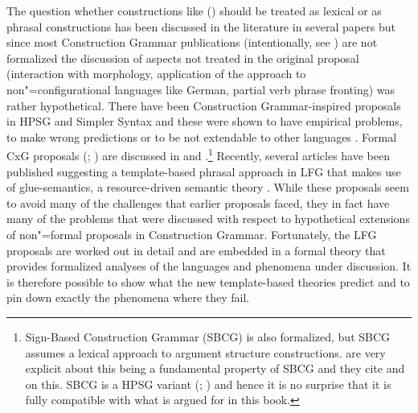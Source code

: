 The question whether constructions like () should be treated as lexical or as
phrasal constructions has been discussed in the literature in several papers
\citep{GJ2004a,Mueller2006d,Goldberg2013b,MWArgSt} but since most Construction Grammar publications
(intentionally, see ) are not formalized the discussion of aspects not treated
in the original proposal (\eg interaction with morphology, application of the approach to
non"=configurational languages like German, partial verb phrase fronting) was rather
hypothetical. There have been Construction Grammar-inspired proposals in HPSG
\citep{Haugereid2007a,Haugereid2009a} and Simpler Syntax \citep{CJ2005a} and these were shown to
have empirical problems, to make wrong predictions or to be not extendable to other languages
\citep{MuellerUnifying,MuellerGT-Eng1}. Formal CxG proposals (\citealp{BC2005a};
\citealp{vanTrijp2011a}) are discussed in  and
.\footnote{%
  Sign-Based Construction Grammar (SBCG) is also formalized, but SBCG assumes a lexical approach to
  argument structure constructions. \citet*{SBK2012a} are very explicit about this being a
  fundamental property of SBCG and they cite  and  on
  this. SBCG is a HPSG variant (; ) and
  hence it is no surprise that it is fully compatible with what is argued for in this book.
} Recently, several articles
have been published suggesting a template-based phrasal approach in LFG that makes use of glue-semantics, a resource-driven semantic
theory \citep*{Christie2010a,AGT2014a}. While these proposals seem to avoid many of the challenges
that earlier proposals faced, they in fact have many of the problems that were discussed with respect
to hypothetical extensions of non"=formal proposals in Construction Grammar. Fortunately, the LFG proposals are worked out in
detail and are embedded in a formal theory that provides formalized analyses of the languages and
phenomena under discussion. It is therefore possible to show what the new template-based theories
predict and to pin down exactly the phenomena where they fail. 

